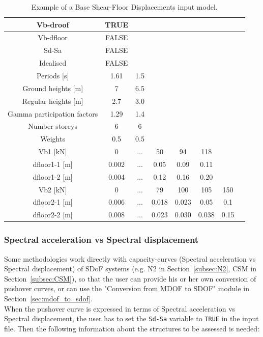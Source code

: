 \begin {table}[htb]
\caption{Example of a Base Shear-Floor Displacements input model.}
\label{table:Vb-dfloor_input}
\begin{center}
  \begin{tabular}{ | c | c | c | c | c | c | c | c |}
  \hline
    Vb-droof & TRUE &  &  & & & \\ \hline
    Vb-dfloor & FALSE & & & & &  \\ \hline
    Sd-Sa & FALSE & & & & & \\ \hline
    Idealised & FALSE & & & & & \\ \hline
    Periods [s] & 1.61 & 1.5 & & & & \\ \hline
    Ground heights [m] & 7 & 6.5 & & & & \\ \hline
    Regular heights [m] & 2.7 & 3.0 & & & & \\ \hline
    Gamma participation factors & 1.29 & 1.4 & & & & \\ \hline
    Number storeys & 6 & 6 & & & & \\ \hline
    Weights & 0.5 & 0.5 & & & & \\ \hline
    Vb1 [kN] & 0	& ...	& 50	& 94	& 118	& \\ \hline
	dfloor1-1 [m] & 0.002	& ...	& 0.05	& 0.09	& 0.11	& \\ \hline
	dfloor1-2 [m] & 0.004	& ...	& 0.12	& 0.16	& 0.20	& \\ \hline
    Vb2 [kN] & 0	& ...	& 79	& 100	& 105	& 150 \\ \hline
    dfloor2-1 [m] & 0.006 &	...	& 0.018	& 0.023	& 0.05	& 0.1 \\ \hline
	dfloor2-2 [m] & 0.008	& ... &	0.023	& 0.030	& 0.038	& 0.15 \\ \hline
  \end{tabular}
\end{center}
\end{table}

\subsubsection{Spectral acceleration vs Spectral displacement}
\label{subsubsec:Sa-Sd}
Some methodologies work directly with capacity-curves (Spectral acceleration vs Spectral displacement) of SDoF systems (e.g. N2 in Section~\ref{subsec:N2}, CSM in Section~\ref{subsec:CSM}), so that the user can provide his or her own conversion of pushover curves, or can use the "Conversion from MDOF to SDOF" module in Section~\ref{sec:mdof_to_sdof}.\\
When the pushover curve is expressed in terms of Spectral acceleration vs Spectral displacement, the user has to set the \verb=Sd-Sa= variable to \verb=TRUE= in the input file. Then the following information about the structures to be assessed is needed:\\


